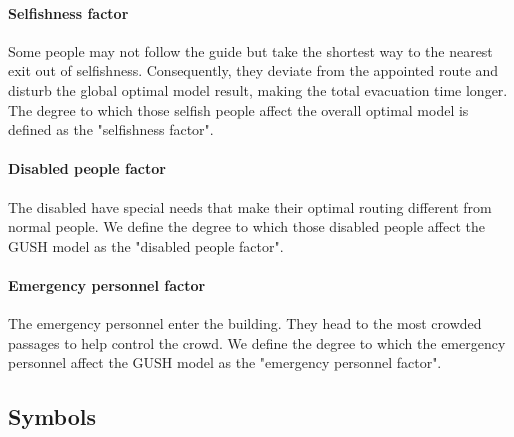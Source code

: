 \documentclass[a4paper,12pt]{article}
\begin{document}
\paragraph{Selfishness factor}  Some people may not follow the guide but take the shortest way to the nearest exit out of selfishness. Consequently, they deviate from the appointed route and disturb the global optimal model result, making the total evacuation time longer. The degree to which those selfish people affect the overall optimal model is defined as the "selfishness factor".
\paragraph{Disabled people factor} The disabled have special needs that make their optimal routing different from normal people. We define the degree to which those disabled people affect the GUSH model as the "disabled people factor".
\paragraph{Emergency personnel factor} The emergency personnel enter the building. They head to the most crowded passages to help control the crowd. We define the degree to which the emergency personnel affect the GUSH model as the "emergency personnel factor".
\subsection{Symbols}
\end{document}
